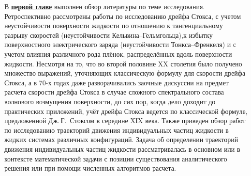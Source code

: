 В \underline{\textbf{первой главе}} выполнен обзор литературы по теме исследования. Ретроспективно рассмотрены работы по исследованию дрейфа Стокса, с учетом  неустойчивости поверхности жидкости по отношению к тангенциальному разрыву скоростей (неустойчивости Кельвина--Гельмгольца),к избытку поверхностного электрического заряда (неустойчивости Тонкса--Френкеля) и с учетом влияния различного рода плёнок, распределённых вдоль поверхности жидкости. Несмотря на то, что во второй половине XX столетия было получено множество выражений, уточняющих классическую формулу для скорости дрейфа Стокса, а в 70-х годах даже разворачивались заочные дискуссии на предмет расчета скорости дрейфа Стокса в случае сложного спектрального состава волнового возмущения поверхности, до сих пор, когда дело доходит до практических приложений, учёт дрейфа Стокса ведется по классической формуле, предложенной Дж.\,Г.~Стоксом в середине XIX века. Также приведен обзор работ по исследованию траекторий движения индивидуальных частиц жидкости в жидких системах различных конфигураций. Задача об определении траекторий движения индивидуальных частиц жидкости рассматривалась в основном или в контексте математической задачи с позиции существования аналитического решения или при помощи численных алгоритмов расчета.

